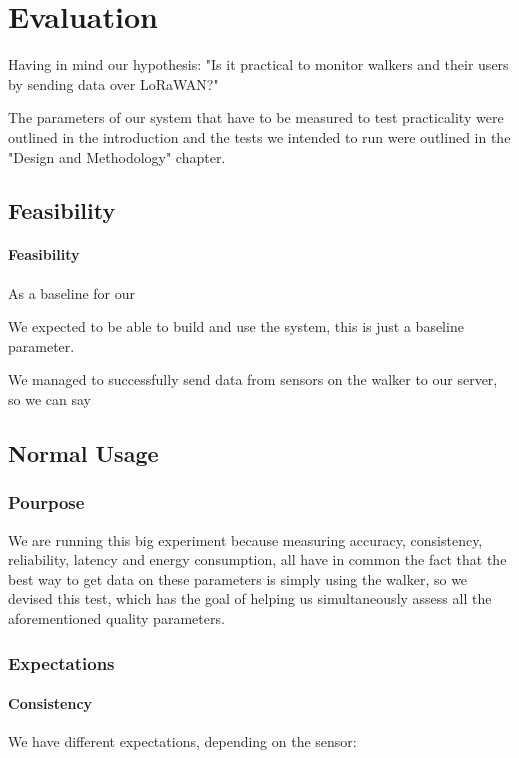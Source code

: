 \chapter{Evaluation}
\label{cha:evaluation}

Having in mind our hypothesis: "Is it practical to monitor walkers and their users by sending data over LoRaWAN?"

The parameters of our system that have to be measured to test practicality were outlined in the introduction and the tests we intended to run were outlined in the "Design and Methodology" chapter.

\section{Feasibility}
\subsubsection{Feasibility}
As a baseline for our 

We expected to be able to build and use the system, this is just a baseline parameter.

We managed to successfully send data from sensors on the walker to our server, so we can say 



\section{Normal Usage}

	\subsection{Pourpose}
	We are running this big experiment because measuring accuracy, consistency, reliability, latency and energy consumption, all have in common the fact that the best way to get data on these parameters is simply using the walker, so we devised this test, which has the goal of helping us simultaneously assess all the aforementioned quality parameters.

	\subsection{Expectations}
		\subsubsection{Consistency}
			We have different expectations, depending on the sensor:

